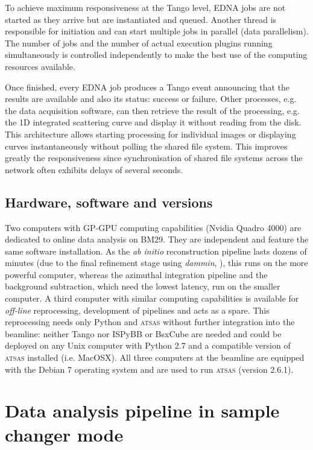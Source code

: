 \documentclass[preprint,pdf]{iucr}              %
\begin{document}
To achieve maximum responsiveness at the Tango level, EDNA jobs are not started as
they arrive but are instantiated and queued.
Another thread is responsible for initiation and can start multiple jobs in parallel
(data parallelism).
The number of jobs and the number of actual execution
plugins running simultaneously is controlled independently to make the best use
of the computing resources available.

Once finished, every EDNA job produces  a Tango event announcing that the
results are available and also its status: success or failure.
Other processes, e.g. the data acquisition software, can then retrieve the result
of the processing, e.g. the 1D integrated scattering curve and
display it without reading from the disk.
This architecture allows starting processing for individual images or
displaying curves instantaneously without polling the shared file system.
This improves greatly the responsiveness since synchronisation of shared
file systems across the network often exhibits delays of several
seconds.

\subsection{Hardware, software and versions}
Two computers with GP-GPU computing capabilities (Nvidia Quadro 4000) are
dedicated to online data analysis on BM29. 
They are independent and feature the same software installation.
As the \textit{ab initio} reconstruction pipeline lasts dozens of minutes
(due to the final refinement stage using \textit{dammin}, \cite{dammin}), this
runs on the more powerful computer, whereas the azimuthal integration pipeline
and the background subtraction, which need the lowest latency, run on the
smaller computer.
A third computer with similar computing capabilities is available for
\textit{off-line} reprocessing, development of pipelines and acts as a spare.
This reprocessing needs only Python and \textsc{atsas} without further
integration into the beamline: neither Tango nor ISPyBB or BsxCube are needed
and could be deployed on any Unix computer with Python 2.7 and a
compatible version of \textsc{atsas} installed (i.e. MacOSX). 
All three computers at the beamline are equipped with the Debian 7 operating
system and are used to run \textsc{atsas} (version 2.6.1).

\section{Data analysis pipeline in sample changer mode}
\end{document}
